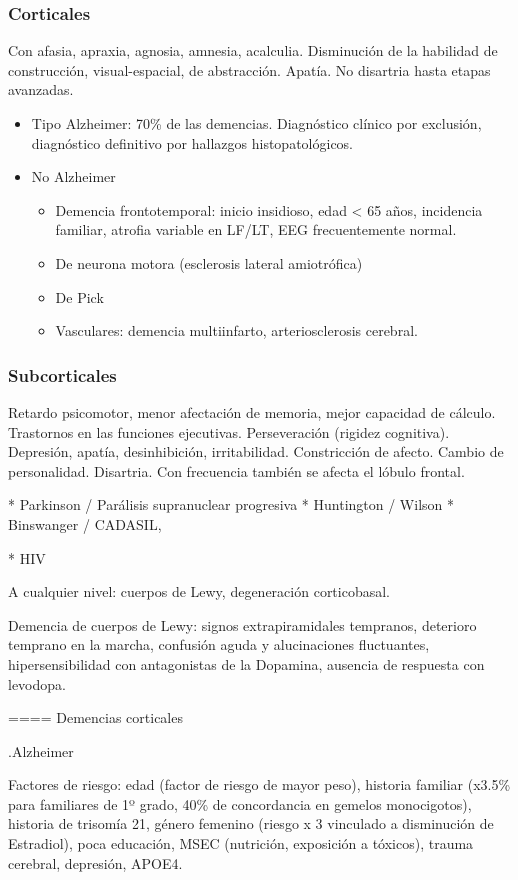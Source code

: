 \subsubsection*{Corticales}
Con afasia, apraxia, agnosia, amnesia, acalculia. Disminución de la habilidad de construcción, visual-espacial, de abstracción. Apatía. No disartria hasta etapas avanzadas.
\begin{itemize}
	\item Tipo Alzheimer: 70\% de las demencias. Diagnóstico clínico por exclusión, diagnóstico definitivo por hallazgos histopatológicos.
	\item No Alzheimer
	\begin{itemize}
		\item Demencia frontotemporal: inicio insidioso, edad < 65 años, incidencia familiar, atrofia variable en LF/LT, EEG frecuentemente normal.
		\item De neurona motora (esclerosis lateral amiotrófica)
		\item De Pick
		\item Vasculares: demencia multiinfarto, arteriosclerosis cerebral.
	\end{itemize}
\end{itemize}
\subsubsection*{Subcorticales}
Retardo psicomotor, menor afectación de memoria, mejor capacidad de cálculo. Trastornos en las funciones ejecutivas. Perseveración (rigidez cognitiva). Depresión, apatía, desinhibición, irritabilidad. Constricción de afecto. Cambio de personalidad. Disartria. Con frecuencia también se afecta el lóbulo frontal.

* Parkinson / Parálisis supranuclear progresiva
* Huntington / Wilson
* Binswanger / CADASIL,

* HIV

A cualquier nivel: cuerpos de Lewy, degeneración corticobasal.

Demencia de cuerpos de Lewy: signos extrapiramidales tempranos, deterioro temprano en la marcha, confusión aguda y alucinaciones fluctuantes, hipersensibilidad con antagonistas de la Dopamina, ausencia de respuesta con levodopa.

==== Demencias corticales

.Alzheimer

Factores de riesgo: edad (factor de riesgo de mayor peso), historia familiar (x3.5\% para familiares de 1º grado, 40\% de concordancia en gemelos monocigotos), historia de trisomía 21, género femenino (riesgo x 3 vinculado a disminución de Estradiol), poca educación, MSEC (nutrición, exposición a tóxicos), trauma cerebral, depresión, APOE4.

